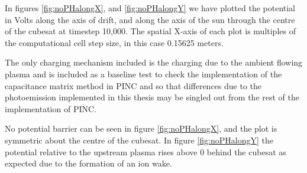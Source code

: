 In figures \ref{fig:noPHalongX}, and \ref{fig:noPHalongY} we have plotted the potential in Volts along the axis of drift, and along the axis of the sun through the centre of the cubesat at timestep 10,000. The spatial X-axis of each plot is multiples of the computational cell step size, in this case 0.15625 meters. 

The only charging mechanism included is the charging due to the ambient flowing plasma and is included as a baseline test to check the implementation of the capacitance matrix method in PINC and so that differences due to the photoemission implemented in this thesis may be singled out from the rest of the implementation of PINC.

No potential barrier can be seen in figure \ref{fig:noPHalongX}, and the plot is symmetric about the centre of the cubesat. In figure \ref{fig:noPHalongY} the potential relative to the upstream plasma rises above 0 behind the cubesat as expected due to the formation of an ion wake.


